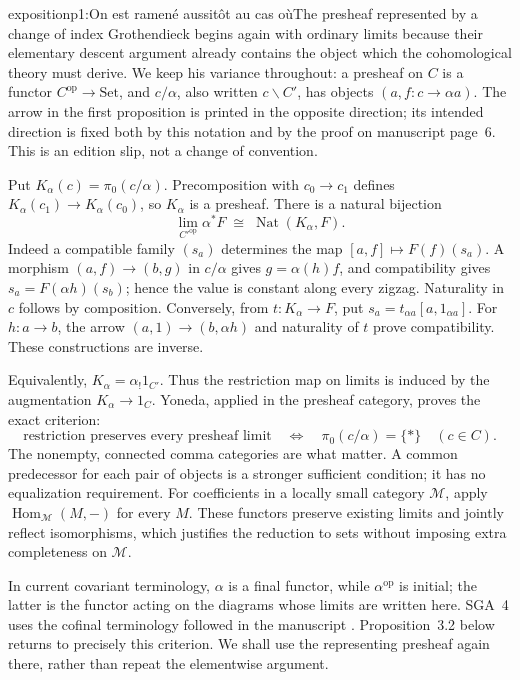 \begin{dcomment}{exposition}{p1:On est ramené aussitôt au cas où}{The presheaf represented by a change of index}
Grothendieck begins again with ordinary limits because their elementary descent argument already contains the object which the cohomological theory must derive. We keep his variance throughout: a presheaf on $C$ is a functor $C^{\mathrm{op}}\to\mathrm{Set}$, and $c/\alpha$, also written $c\backslash C'$, has objects $(a,f:c\to\alpha a)$. The arrow in the first proposition is printed in the opposite direction; its intended direction is fixed both by this notation and by the proof on manuscript page~6. This is an edition slip, not a change of convention.

Put $K_\alpha(c)=\pi_0(c/\alpha)$. Precomposition with $c_0\to c_1$ defines $K_\alpha(c_1)\to K_\alpha(c_0)$, so $K_\alpha$ is a presheaf. There is a natural bijection
\[
 \lim_{C'^{\mathrm{op}}}\alpha^*F
 \;\cong\;\operatorname{Nat}(K_\alpha,F).
\]
Indeed a compatible family $(s_a)$ determines the map $[a,f]\mapsto F(f)(s_a)$. A morphism $(a,f)\to(b,g)$ in $c/\alpha$ gives $g=\alpha(h)f$, and compatibility gives $s_a=F(\alpha h)(s_b)$; hence the value is constant along every zigzag. Naturality in $c$ follows by composition. Conversely, from $t:K_\alpha\to F$, put $s_a=t_{\alpha a}[a,1_{\alpha a}]$. For $h:a\to b$, the arrow $(a,1)\to(b,\alpha h)$ and naturality of $t$ prove compatibility. These constructions are inverse.

Equivalently, $K_\alpha=\alpha_!1_{C'}$. Thus the restriction map on limits is induced by the augmentation $K_\alpha\to1_C$. Yoneda, applied in the presheaf category, proves the exact criterion:
\[
 \text{restriction preserves every presheaf limit}
 \quad\Longleftrightarrow\quad
 \pi_0(c/\alpha)=\{*\}\quad(c\in C).
\]
The nonempty, connected comma categories are what matter. A common predecessor for each pair of objects is a stronger sufficient condition; it has no equalization requirement. For coefficients in a locally small category $\mathcal M$, apply $\operatorname{Hom}_{\mathcal M}(M,-)$ for every $M$. These functors preserve existing limits and jointly reflect isomorphisms, which justifies the reduction to sets without imposing extra completeness on $\mathcal M$.

In current covariant terminology, $\alpha$ is a final functor, while $\alpha^{\mathrm{op}}$ is initial; the latter is the functor acting on the diagrams whose limits are written here. SGA~4 uses the cofinal terminology followed in the manuscript \citep[Expos\'e~I, \S8.1]{SGA4I1972}. Proposition~3.2 below returns to precisely this criterion. We shall use the representing presheaf again there, rather than repeat the elementwise argument.
\end{dcomment}

